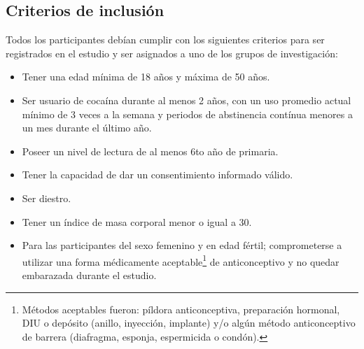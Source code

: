 \subsection{Criterios de inclusión}
Todos los participantes debían cumplir con los siguientes criterios para ser registrados en el estudio y ser asignados a uno de los grupos de investigación:
\begin{itemize}
    \item Tener una edad mínima de 18 años y máxima de 50 años.
    \item Ser usuario de cocaína durante al menos 2 años, con un uso promedio actual mínimo de 3 veces a la semana y periodos de abstinencia contínua menores a un mes durante el último año.
    \item Poseer un nivel de lectura de al menos 6to año de primaria.
    \item Tener la capacidad de dar un consentimiento informado válido.
    \item Ser diestro.
    \item Tener un índice de masa corporal menor o igual a 30.
    \item Para las participantes del sexo femenino y en edad fértil; comprometerse a utilizar una forma médicamente aceptable\footnote{Métodos aceptables fueron: píldora anticonceptiva, preparación hormonal, DIU o depósito (anillo, inyección, implante) y/o algún método anticonceptivo de barrera (diafragma, esponja, espermicida o condón).} de anticonceptivo y no quedar embarazada durante el estudio.
\end{itemize}

